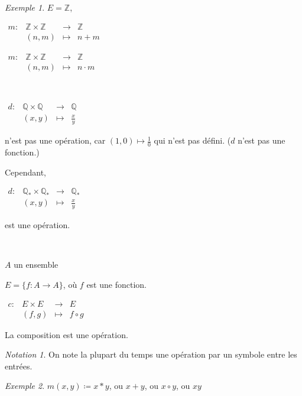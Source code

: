 \documentclass{report}
\theoremstyle{definition}
\theoremstyle{remark}
\newtheorem*{exem}{Exemple}
\newtheorem*{nota}{Notation}
\begin{document}
	\begin{exem}
		$E=\mathbb{Z}$,

		$\begin{array}{rrcl}
			m:&\mathbb{Z} \times \mathbb{Z} &\longrightarrow& \mathbb{Z}\\
			&(n,m)&\longmapsto&n + m
		\end{array}$

		$\begin{array}{rrcl}
			m:&\mathbb{Z} \times \mathbb{Z} &\longrightarrow& \mathbb{Z}\\
			&(n,m)&\longmapsto&n \cdot m
		\end{array}$

		~

		$\begin{array}{rrcl}
			d:&\mathbb{Q} \times \mathbb{Q}&\longrightarrow&\mathbb{Q}\\
			&(x,y)&\longmapsto&\frac{x}{y}
		\end{array}$

		n'est pas une op\'eration, car $(1,0) \mapsto \frac{1}{0}$ qui n'est pas d\'efini. ($d$ n'est pas une fonction.)

		Cependant,

		$\begin{array}{rrcl}
			d:&\mathbb{Q}_* \times \mathbb{Q}_*&\longrightarrow&\mathbb{Q}_*\\
			&(x,y)&\longmapsto&\frac{x}{y}
		\end{array}$

		est une op\'eration.

		~

		$A$ un ensemble

		$E=\{f:A \to A\}$, o\`u $f$ est une fonction.

		$\begin{array}{rrcl}
			c:&E \times E&\longrightarrow&E\\
			&(f,g)&\longmapsto&f \circ g
		\end{array}$

		La composition est une op\'eration.
	\end{exem}

	\begin{nota}
		On note la plupart du temps une op\'eration par un symbole entre les entr\'ees.
	\end{nota}

	\begin{exem}
		$m(x,y) \coloneq x*y$, ou $x+y$, ou $x \circ y$, ou $xy$
	\end{exem}
\end{document}
